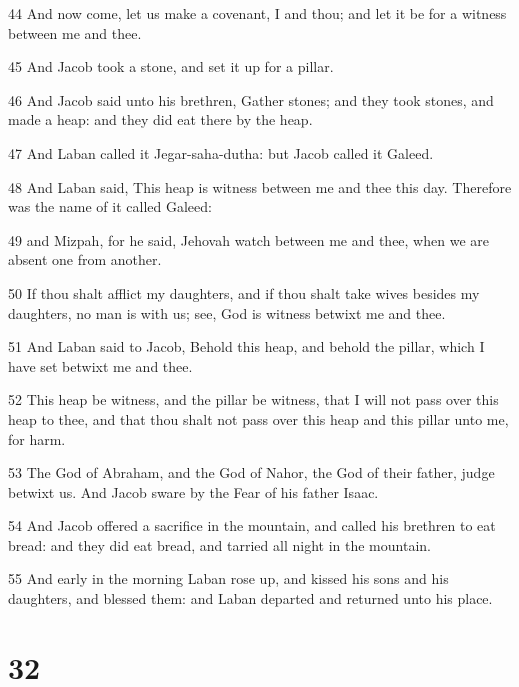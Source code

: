 \par 44 And now come, let us make a covenant, I and thou; and let it be for a witness between me and thee.
\par 45 And Jacob took a stone, and set it up for a pillar.
\par 46 And Jacob said unto his brethren, Gather stones; and they took stones, and made a heap: and they did eat there by the heap.
\par 47 And Laban called it Jegar-saha-dutha: but Jacob called it Galeed.
\par 48 And Laban said, This heap is witness between me and thee this day. Therefore was the name of it called Galeed:
\par 49 and Mizpah, for he said, Jehovah watch between me and thee, when we are absent one from another.
\par 50 If thou shalt afflict my daughters, and if thou shalt take wives besides my daughters, no man is with us; see, God is witness betwixt me and thee.
\par 51 And Laban said to Jacob, Behold this heap, and behold the pillar, which I have set betwixt me and thee.
\par 52 This heap be witness, and the pillar be witness, that I will not pass over this heap to thee, and that thou shalt not pass over this heap and this pillar unto me, for harm.
\par 53 The God of Abraham, and the God of Nahor, the God of their father, judge betwixt us. And Jacob sware by the Fear of his father Isaac.
\par 54 And Jacob offered a sacrifice in the mountain, and called his brethren to eat bread: and they did eat bread, and tarried all night in the mountain.
\par 55 And early in the morning Laban rose up, and kissed his sons and his daughters, and blessed them: and Laban departed and returned unto his place.

\chapter{32}

